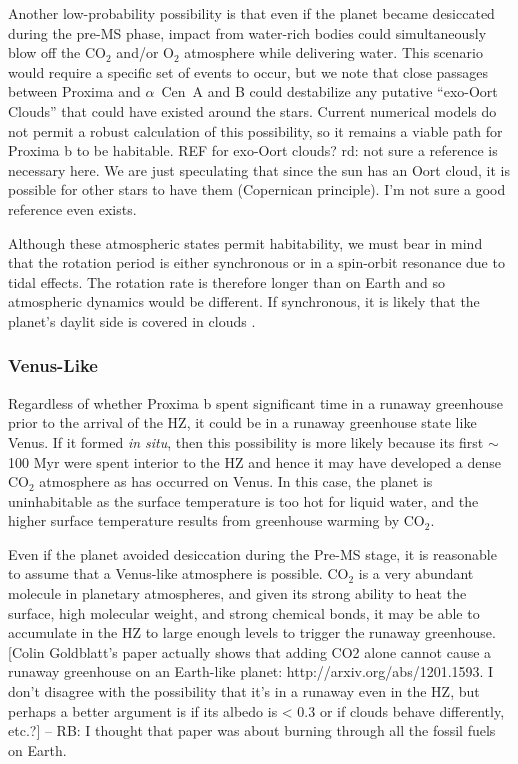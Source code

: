\documentclass[preprint,12pt]{aastex}
\newcommand{\xxx}[1]{{\color{red} #1}} %
\def\acen{{$\alpha$~Cen}}
\begin{document}
Another low-probability possibility is that even if the planet became
desiccated during the pre-MS phase, impact from water-rich bodies
could simultaneously blow off the CO$_2$ and/or O$_2$ atmosphere while
delivering water. This scenario would require a specific set of events to occur, but we note
that close passages between Proxima and \acen~A and B could destabilize
any putative ``exo-Oort Clouds'' that could have existed around the
stars. Current numerical models do not permit a robust calculation of
this possibility, so it remains a viable path for Proxima b to be
habitable. \xxx{REF for exo-Oort clouds?} \xxx{rd: not sure a reference is 
necessary here. We are just speculating that since the sun
has an Oort cloud, it is possible for other stars to have them (Copernican
principle). I'm not sure a good reference even exists.}

Although these atmospheric states permit habitability, we must bear in
mind that the rotation period is either synchronous or in a spin-orbit
resonance due to tidal effects. The rotation rate is therefore longer
than on Earth and so atmospheric dynamics would be different. If
synchronous, it is likely that the planet's daylit side is
covered in clouds \citep{Yang13}.

\subsubsection{Venus-Like}
\label{sec:results:atmstates:venuslike}


Regardless of whether Proxima b spent significant time in a runaway
greenhouse prior to the arrival of the HZ, it could be in a runaway
greenhouse state like Venus. If it formed {\it in situ}, then this
possibility is more likely because its first $\sim$100 Myr were spent
interior to the HZ and hence it may have developed a dense CO$_2$
atmosphere as has occurred on Venus. In this case, the planet is
uninhabitable as the surface temperature is too hot for liquid water,
and the higher surface temperature results from greenhouse warming by
CO$_2$.

Even if the planet avoided desiccation during the Pre-MS stage, it is
reasonable to assume that a Venus-like atmosphere is possible. CO$_2$
is a very abundant molecule in planetary atmospheres, and given its
strong ability to heat the surface, high molecular weight, and strong
chemical bonds, it may be able to accumulate in the HZ to large enough
levels to trigger the runaway greenhouse. \xxx{[Colin Goldblatt's
paper actually shows that adding CO2 alone cannot cause a runaway
greenhouse on an Earth-like planet: http://arxiv.org/abs/1201.1593.
I don't disagree with the possibility that it's in a runaway even in 
the HZ, but perhaps a better argument is if its albedo is < 0.3 or if
clouds behave differently, etc.?] -- RB: I thought that paper was about burning through all the fossil fuels on Earth.}
\end{document}
